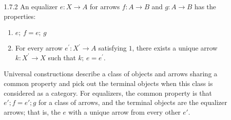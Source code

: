\documentclass{article}
\begin{document}
\begin{enumerate}
\item[1.7.2]
  An equalizer $e : X \rightarrow A$ for arrows $f: A \rightarrow B$ and $g: A \rightarrow B$ has the properties:

  \begin{enumerate}
  \item $e;\ f = e;\ g$
  \item For every arrow $e^\prime: X^\prime \rightarrow A$ satisfying $1$, there exists a unique arrow $k: X^\prime \rightarrow X$ such that $k;\ e = e^\prime$.
  \end{enumerate}

  Universal constructions describe a class of objects and arrows sharing a common property and pick out the terminal objects when this class is considered as a category.
  For equalizers, the common property is that $e'; f = e'; g$ for a class of arrows, and the terminal objects are the equalizer arrows; that is, the $e$ with a unique arrow from every other $e'$.

\end{enumerate}
\end{document}
